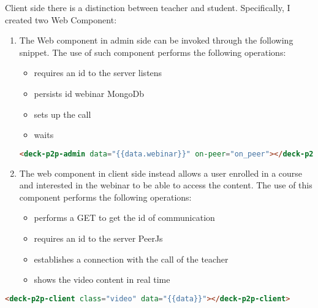 Client side there is a distinction between teacher and student. Specifically, I created two Web Component:
\begin{enumerate}

\item The Web component in admin side can be invoked through the following snippet.
The use of such component performs the following operations:
\begin{itemize}
\item requires an id to the server listens
\item persists id webinar MongoDb
\item sets up the call
\item waits
\end{itemize}

\begin{lstlisting}[language=html]
 <deck-p2p-admin data="{{data.webinar}}" on-peer="on_peer"></deck-p2p-admin>
\end{lstlisting}

\item The web component in client side instead allows a user enrolled in a course and interested in the webinar to be able to access the content.
The use of this component performs the following operations:
\begin{itemize}
\item performs a GET to get the id of communication
\item requires an id to the server PeerJs
\item establishes a connection with the call of the teacher
\item shows the video content in real time
\end{itemize}

\end{enumerate}
\begin{lstlisting}[language=html]
  <deck-p2p-client class="video" data="{{data}}"></deck-p2p-client>
\end{lstlisting}


